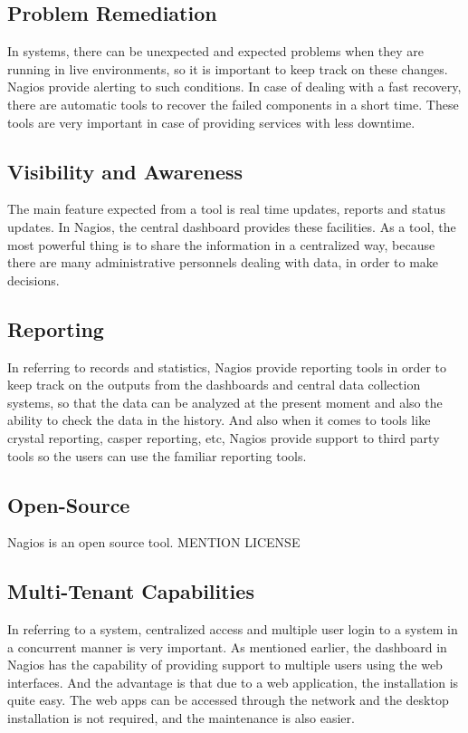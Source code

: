 \documentclass[9pt,twocolumn,twoside]{styles/osajnl}
\begin{document}
\subsection{Problem Remediation}

In systems, there can be unexpected and expected problems when they
are running in live environments, so it is important to keep track on
these changes. Nagios provide alerting to such conditions. In case of
dealing with a fast recovery, there are automatic tools to recover the
failed components in a short time. These tools are very important in
case of providing services with less downtime.

\subsection{Visibility and Awareness}

The main feature expected from a tool is real time updates, reports
and status updates. In Nagios, the central dashboard provides these
facilities. As a tool, the most powerful thing is to share the
information in a centralized way, because there are many
administrative personnels dealing with data, in order to make
decisions.

\subsection{Reporting}

In referring to records and statistics, Nagios provide reporting tools
in order to keep track on the outputs from the dashboards and central
data collection systems, so that the data can be analyzed at the
present moment and also the ability to check the data in the history.
And also when it comes to tools like crystal reporting, casper
reporting, etc, Nagios provide support to third party tools so the
users can use the familiar reporting tools.

\subsection{Open-Source}

Nagios is an open source tool. MENTION LICENSE

\subsection{Multi-Tenant Capabilities}

In referring to a system, centralized access and multiple user login
to a system in a concurrent manner is very important. As mentioned
earlier, the dashboard in Nagios has the capability of providing
support to multiple users using the web interfaces. And the advantage
is that due to a web application, the installation is quite easy. The
web apps can be accessed through the network and the desktop
installation is not required, and the maintenance is also easier.
\end{document}
